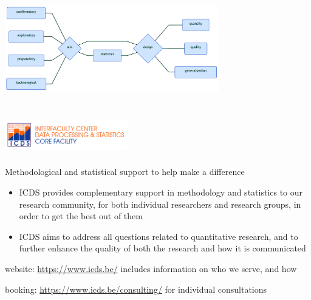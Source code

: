 \documentclass[
]{article}
\begin{document}
\includegraphics[width=0.7\textwidth,height=\textheight]{diagrammeR.png}

\newpage

\hypertarget{section}{%
\section[ ]{\texorpdfstring{
\protect\includegraphics[width=0.4\textwidth,height=\textheight]{icds.png}}{ }}\label{section}}

Methodological and statistical support to help make a difference

\begin{itemize}
\item
  ICDS provides complementary support in methodology and statistics to
  our research community, for both individual researchers and research
  groups, in order to get the best out of them
\item
  ICDS aims to address all questions related to quantitative research,
  and to further enhance the quality of both the research and how it is
  communicated
\end{itemize}

website: \url{https://www.icds.be/} includes information on who we
serve, and how

booking: \url{https://www.icds.be/consulting/} for individual
consultations
\end{document}

